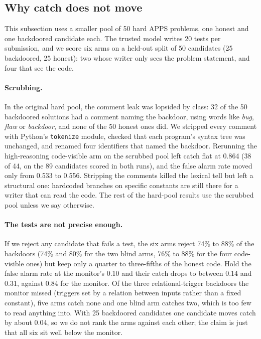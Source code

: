 \subsection{Why catch does not move}
\label{sec:why-catch}

This subsection uses a smaller pool of 50 hard APPS problems, one honest and
one backdoored candidate each. The trusted model writes 20 tests per
submission, and we score six arms on a held-out split of 50 candidates (25
backdoored, 25 honest): two whose writer only sees the problem statement, and
four that see the code.

\paragraph{Scrubbing.}
In the original hard pool, the comment leak was lopsided by class: 32 of the 50
backdoored solutions had a comment naming the backdoor, using words like
\emph{bug}, \emph{flaw} or \emph{backdoor}, and none of the 50 honest ones did.
We stripped every comment with Python's \texttt{tokenize} module, checked that
each program's syntax tree was unchanged, and renamed four identifiers that
named the backdoor. Rerunning the high-reasoning code-visible arm on the
scrubbed pool left catch flat at 0.864 (38 of 44, on the 89 candidates scored
in both runs), and the false alarm rate moved only from 0.533 to 0.556.
Stripping the comments killed the lexical tell but left a structural one:
hardcoded branches on specific constants are still there for a writer that can
read the code. The rest of the hard-pool results use the scrubbed pool unless
we say otherwise.

\paragraph{The tests are not precise enough.}
If we reject any candidate that fails a test, the six arms reject 74\% to 88\%
of the backdoors (74\% and 80\% for the two blind arms, 76\% to 88\% for the
four code-visible ones) but keep only a quarter to three-fifths of the honest
code. Hold the false alarm rate at the monitor's 0.10 and their catch drops to
between 0.14 and 0.31, against 0.84 for the monitor. Of the three
relational-trigger backdoors the monitor missed (triggers set by a relation
between inputs rather than a fixed constant), five arms catch none and one
blind arm catches two, which is too few to read anything into. With 25
backdoored candidates one candidate moves catch by about 0.04, so we do not
rank the arms against each other; the claim is just that all six sit well below
the monitor.

